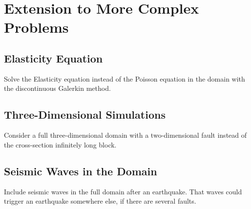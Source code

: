 \chapter{Extension to More Complex Problems}
\section{Elasticity Equation}
Solve the Elasticity equation instead of the Poisson equation in the domain with the discontinuous Galerkin method.

\section{Three-Dimensional Simulations}
Consider a full three-dimensional domain with a two-dimensional fault instead of the cross-section infinitely long block. 


\section{Seismic Waves in the Domain}
Include seismic waves in the full domain after an earthquake. That waves could trigger an earthquake somewhere else, if there are several faults. \\



